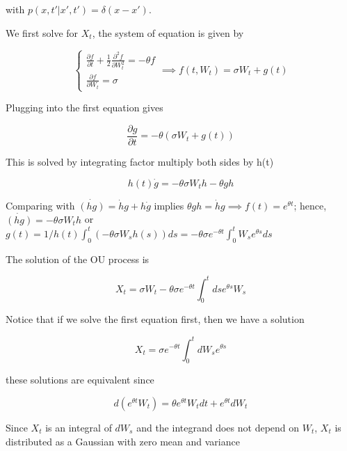 \documentclass[11pt,a4paper]{article}
\begin{document}
with $p(x,t'|x',t') = \delta(x-x')$.

We first solve for $X_t$, the system of equation is given by

\begin{equation}
    \begin{cases}
        \frac{\partial f}{\partial t} + \frac{1}{2}\frac{\partial^2 f}{\partial W_t^2} = -\theta f \\
    \frac{\partial f}{\partial W_t}  = \sigma       
    \end{cases} \implies f(t,W_t) = \sigma W_t + g(t)
\end{equation}


Plugging into the first equation gives 


\begin{equation}
    \frac{\partial g}{\partial t} = -\theta (\sigma W_t + g(t))    
\end{equation}

This is solved by integrating factor multiply both sides by h(t)

\begin{equation}
    h(t)\dot{g} = -\theta  \sigma W_th-\theta gh
\end{equation}

Comparing with $\dot{(hg)} = \dot{h}g+h\dot{g}$ implies $\theta gh = \dot{h}g \implies f(t) = e^{\theta t}$; hence, $\dot{(hg)} = -\theta \sigma W_t h$ or $g(t) = 1/h(t) \int_{0}^{t}(-\theta \sigma W_s h(s))ds = -\theta \sigma e^{-\theta t}\int_{0}^{t}W_s e^{\theta s}ds$

The solution of the OU process is

\begin{equation}
    X_t = \sigma W_t -\theta \sigma e^{-\theta t}\int_{0}^{t}ds e^{\theta s}W_s 
\end{equation}

Notice that if we solve the first equation first, then we have a solution

\begin{equation}
    X_t = \sigma e^{-\theta t}\int_{0}^{t}dW_s e^{\theta s}
\end{equation}

these solutions are equivalent since

\begin{equation}
    d(e^{\theta t}W_t) = \theta e^{\theta t}W_t dt + e^{\theta t}dW_t
\end{equation}

Since $X_t$ is an integral of $dW_s$ and the integrand does not depend on $W_t$, $X_t$ is distributed as a Gaussian with zero mean and variance 
\end{document}
